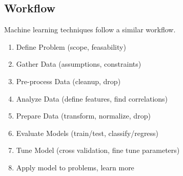 \subsection{Workflow}
\label{subsec:introduction-workflow}
\begin{frame}{\insertsubsection}
    Machine learning techniques follow a similar workflow.
    \begin{enumerate}[<+->]
        \item Define Problem (scope, feasability)
        \item Gather Data (assumptions, constraints)
        \item Pre-process Data (cleanup, drop)
        \item Analyze Data (define features, find correlations)
        \item Prepare Data (transform, normalize, drop)
        \item Evaluate Models (train/test, classify/regress)
        \item Tune Model (cross validation, fine tune parameters)
        \item Apply model to problems, learn more
    \end{enumerate}
\end{frame}